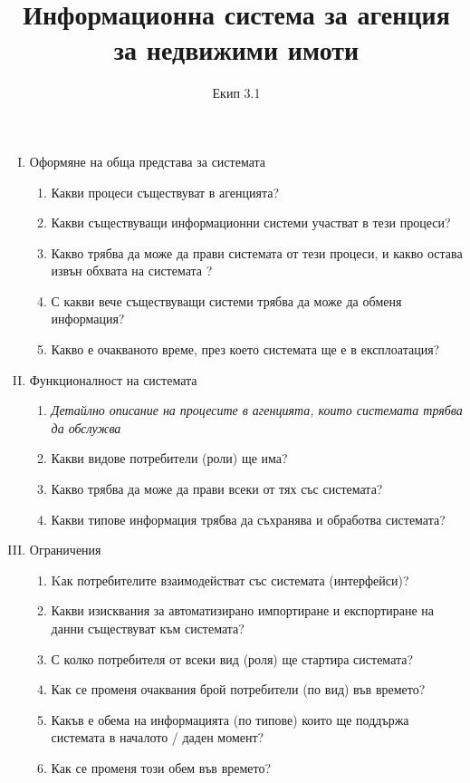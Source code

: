\documentclass[]{article}
\begin{document}
\title{Информационна система за агенция за недвижими имоти}
\author{Екип 3.1}
\maketitle

\begin{enumerate}[I.]
	\item {Оформяне на обща представа за системата
		\begin{enumerate}[1.]
			\item Какви процеси съществуват в агенцията?
			\item Какви съществуващи информационни системи участват в тези процеси?
			\item Какво трябва да може да прави системата от тези процеси, и какво остава извън обхвата на системата ?
			\item С какви вече съществуващи системи трябва да може да обменя информация?
			\item Какво е очакваното време, през което системата ще е в експлоатация?
		\end{enumerate}
	}
	\item {Функционалност на системата
		\begin{enumerate}[1.]	
			\item \emph{Детайлно описание на процесите в агенцията, които системата трябва да обслужва}
			\item Какви видове потребители (роли) ще има?
			\item Какво трябва да може да прави всеки от тях със системата?
			\item Какви типове информация трябва да съхранява и обработва системата?
		\end{enumerate}
	}
	\item {Ограничения
		\begin{enumerate}[1.]	
			\item Kак потребителите взаимодействат със системата (интерфейси)?
			\item Какви изисквания за автоматизирано импортиране и експортиране на данни съществуват към системата?
			\item С колко потребителя от всеки вид (роля) ще стартира системата?
			\item Как се променя очаквания брой потребители (по вид) във времето?
			\item Какъв е обема на информацията (по типове) които ще поддържа системата в началото / даден момент?
			\item Как се променя този обем във времето?

\end{enumerate}}
\end{enumerate}
\end{document}
